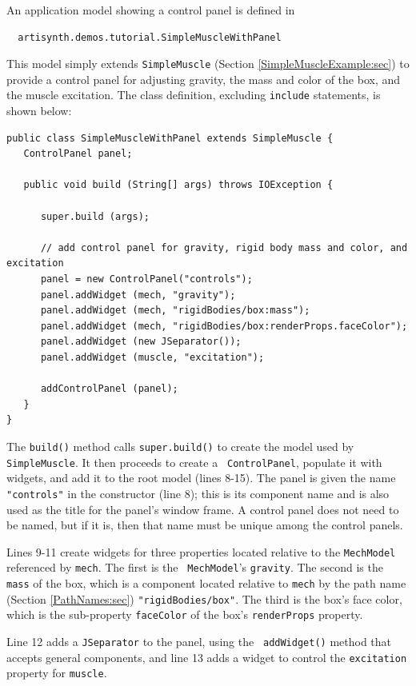 An application model showing a control panel is defined in
%
\begin{verbatim}
  artisynth.demos.tutorial.SimpleMuscleWithPanel
\end{verbatim}
%
This model simply extends {\tt SimpleMuscle} (Section
\ref{SimpleMuscleExample:sec}) to provide a control panel for
adjusting gravity, the mass and color of the box, and the muscle
excitation. The class definition, excluding {\tt include} statements,
is shown below:
%
\lstset{numbers=left}
\begin{lstlisting}[]
public class SimpleMuscleWithPanel extends SimpleMuscle {
   ControlPanel panel;

   public void build (String[] args) throws IOException {

      super.build (args);

      // add control panel for gravity, rigid body mass and color, and excitation
      panel = new ControlPanel("controls");
      panel.addWidget (mech, "gravity");
      panel.addWidget (mech, "rigidBodies/box:mass");
      panel.addWidget (mech, "rigidBodies/box:renderProps.faceColor");
      panel.addWidget (new JSeparator());
      panel.addWidget (muscle, "excitation");

      addControlPanel (panel);
   }
}
\end{lstlisting}
\lstset{numbers=none}
%
The {\tt build()} method calls {\tt super.build()} to create the model
used by {\tt SimpleMuscle}. It then proceeds to create a {\tt
ControlPanel}, populate it with widgets, and add
it to the root model (lines 8-15). The panel is given the name {\tt
"controls"} in the constructor (line 8); this is its component name
and is also used as the title for the panel's window frame. A control
panel does not need to be named, but if it is, then that name must be
unique among the control panels.

Lines 9-11 create widgets for three properties located relative to the
{\tt MechModel} referenced by {\tt mech}. The first is the {\tt
MechModel}'s {\tt gravity}. The second is the {\tt mass} of the box,
which is a component located relative to {\tt mech} by the path name
(Section \ref{PathNames:sec}) {\tt "rigidBodies/box"}. The third is
the box's face color, which is the sub-property {\tt faceColor} of the
box's {\tt renderProps} property.

Line 12 adds a {\tt JSeparator} to the panel, using the {\tt
addWidget()} method that accepts general components, and line 13 adds
a widget to control the {\tt excitation} property for {\tt muscle}.

